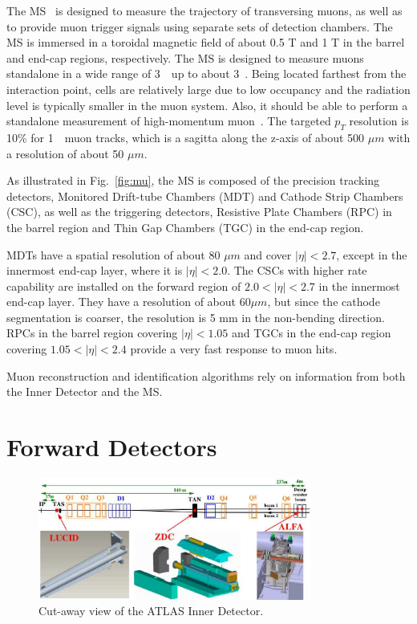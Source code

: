 \par The MS~\cite{CERN-LHCC-97-022} is designed to measure the trajectory of transversing muons, as well as to provide muon trigger signals using separate sets of detection chambers. The MS is immersed in a toroidal magnetic field of about 0.5 T and 1 T in the barrel and end-cap regions, respectively. The MS is designed to measure muons standalone in a wide range of 3~\GeV~up to about 3~\TeV. Being located farthest from the interaction point, cells are relatively large due to low occupancy and the radiation level is typically smaller in the muon system. Also, it should be able to perform a standalone measurement of high-momentum muon~\cite{muon}.
The targeted $p_T$ resolution is 10\% for 1~\TeV~muon tracks, which is a sagitta along the z-axis of about 500 $\mu m$ with a resolution of about 50 $\mu m$.

\par As illustrated in Fig.~\ref{fig:mu}, the MS is composed of the precision tracking detectors, Monitored Drift-tube Chambers (MDT) and Cathode Strip Chambers (CSC), as well as the triggering detectors, Resistive Plate Chambers (RPC) in the barrel region and Thin Gap Chambers (TGC) in the end-cap region.

\par MDTs have a spatial resolution of about 80 $\mu m$ and cover $|\eta| < 2.7$, except in the innermost end-cap layer, where it is $|\eta| < 2.0$. The CSCs with higher rate capability are installed on the forward region of $2.0 < |\eta| < 2.7$ in the innermost end-cap layer. They have a resolution of about 60$\mu m$, but since the cathode segmentation is coarser, the resolution is 5 mm in the non-bending direction. RPCs in the barrel region covering $|\eta| < 1.05$ and TGCs in the end-cap region covering $1.05 < |\eta| < 2.4$ provide a very fast response to muon hits.


\par Muon reconstruction and identification algorithms rely on information from both the Inner Detector and the MS.

\section{Forward Detectors}
\label{sec:for}
\begin{figure}[htbp]
    \centering
    \includegraphics[width=0.8\textwidth]{chapters/c4/figures/forward}
    \caption{Cut-away view of the ATLAS Inner Detector.}
    \label{fig:forward}
\end{figure}

